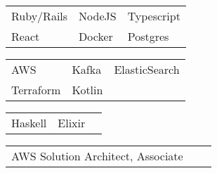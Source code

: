 \documentclass[a4paper,12pt]{memoir} %
\begin{document}
\userinformation %

\framebreak %






{
	\begin{tabular}{p{} p{} p{}}
		\bluebullet Ruby/Rails & \bluebullet NodeJS & \bluebullet Typescript\\
		\bluebullet React & \bluebullet Docker & \bluebullet Postgres\\
	\end{tabular}
}

{
	\begin{tabular}{p{} p{} p{}}
		\bluebullet AWS &  \bluebullet Kafka & \bluebullet ElasticSearch\\
		\bluebullet Terraform &  \bluebullet Kotlin \\
	\end{tabular}
}

{
	\begin{tabular}{p{} p{} p{}}
	\bluebullet Haskell &  \bluebullet Elixir
	\end{tabular}
}

{
	\begin{tabular}{p{} p{} p{}}
	\bluebullet AWS Solution Architect, Associate\\
	\end{tabular}
}

\Sep %
\end{document}

